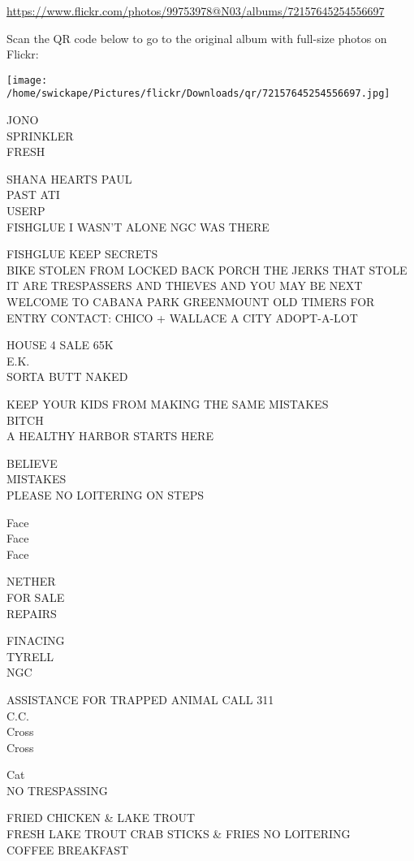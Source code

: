 \documentclass[10pt,letterpaper]{article}
\begin{document}
\url{https://www.flickr.com/photos/99753978@N03/albums/72157645254556697}

Scan the QR code below to go to the original album with full-size photos on Flickr:

\texttt{[image: /home/swickape/Pictures/flickr/Downloads/qr/72157645254556697.jpg]}
\pagebreak

JONO\\
SPRINKLER\\
FRESH

SHANA HEARTS PAUL\\
PAST ATI\\
USERP\\
FISHGLUE I WASN'T ALONE NGC WAS THERE

FISHGLUE KEEP SECRETS\\
BIKE STOLEN FROM LOCKED BACK PORCH THE JERKS THAT STOLE IT ARE TRESPASSERS AND THIEVES AND YOU MAY BE NEXT\\
WELCOME TO CABANA PARK GREENMOUNT OLD TIMERS FOR ENTRY CONTACT: CHICO + WALLACE A CITY ADOPT{-}A{-}LOT

HOUSE 4 SALE 65K\\
E.K.\\
SORTA BUTT NAKED

KEEP YOUR KIDS FROM MAKING THE SAME MISTAKES\\
BITCH\\
A HEALTHY HARBOR STARTS HERE

BELIEVE\\
MISTAKES\\
PLEASE NO LOITERING ON STEPS

Face\\
Face\\
Face

NETHER\\
FOR SALE\\
REPAIRS

FINACING\\
TYRELL\\
NGC

ASSISTANCE FOR TRAPPED ANIMAL CALL 311\\
C.C.\\
Cross\\
Cross

Cat\\
NO TRESPASSING

FRIED CHICKEN \& LAKE TROUT\\
FRESH LAKE TROUT CRAB STICKS \& FRIES NO LOITERING\\
COFFEE BREAKFAST
\end{document}
